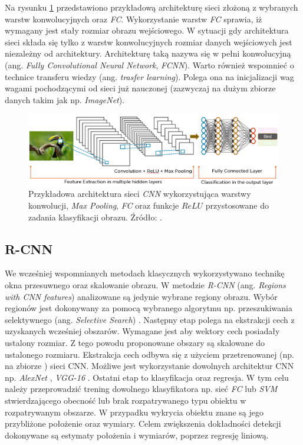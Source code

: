 Na rysunku \ref{fig:example_layers} przedstawiono przykładową architekturę sieci złożoną z wybranych warstw konwolucyjnych oraz \emph{FC}. 
Wykorzystanie warstw \emph{FC} sprawia, iż wymagany jest stały rozmiar obrazu wejściowego.
W sytuacji gdy architektura sieci składa się tylko z warstw konwolucyjnych rozmiar danych wejściowych jest niezależny od architektury. 
Architekturę taką nazywa się w pełni konwolucyjną (ang. \emph{Fully Convolutional Neural Network}, \emph{FCNN}).
Warto również wspomnieć o technice transferu wiedzy (ang. \emph{trasfer learning}). 
Polega ona na inicjalizacji wag wagami pochodzącymi od sieci już nauczonej (zazwyczaj na dużym zbiorze danych takim jak np. \emph{ImageNet}).
\begin{figure}
    \centering
    \includegraphics[width=0.9\linewidth]{images/layers_.png}
    \caption{Przykładowa architektura sieci \emph{CNN} wykorzystująca warstwy konwolucji, \emph{Max Pooling}, \emph{FC} oraz funkcje $ReLU$ przystosowane do zadania klasyfikacji obrazu.
    Źródło: \cite{layers_types}.}
    \label{fig:example_layers}
\end{figure}
 

\subsection{R-CNN}

We wcześniej wspomnianych metodach klasycznych wykorzystywano technikę okna przesuwnego oraz skalowanie obrazu. 
W metodzie \emph{R-CNN} (ang. \emph{Regions with CNN features}) \cite{r_cnn} analizowane są jedynie wybrane regiony obrazu. 
Wybór regionów jest dokonywany za pomocą wybranego algorytmu np. przeszukiwania selektywnego (ang. \emph{Selective Search}) \cite{sel_search}.
Następny etap polega na ekstrakcji cech z uzyskanych wcześniej obszarów.
Wymagane jest aby wektory cech posiadały ustalony rozmiar. 
Z tego powodu proponowane obszary są skalowane do ustalonego rozmiaru.
Ekstrakcja cech odbywa się z użyciem przetrenowanej (np. na zbiorze \cite{imagenet}) sieci CNN.
Możliwe jest wykorzystanie dowolnych architektur CNN np. \emph{AlexNet} \cite{alexnet}, \emph{VGG-16} \cite{vgg}.
Ostatni etap to klasyfikacja oraz regresja.
W tym celu należy przeprowadzić trening dowolnego klasyfikatora np. sieć \emph{FC} lub \emph{SVM} stwierdzającego obecność lub brak rozpatrywanego typu obiektu w rozpatrywanym obszarze.
W przypadku wykrycia obiektu znane są jego przybliżone położenie oraz wymiary.
Celem zwiększenia dokładności detekcji dokonywane są estymaty położenia i wymiarów, poprzez regresję liniową.

